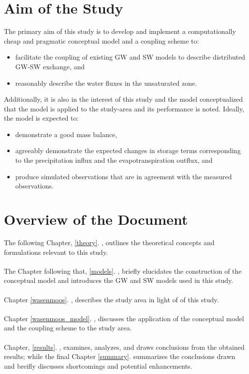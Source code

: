 \section{Aim of the Study}  \label{aim}
The primary aim of this study is to develop and implement a computationally cheap and pragmatic conceptual model and a coupling scheme to:
\begin{itemize}
    \item facilitate the coupling of existing GW and SW models to describe distributed GW-SW exchange, and
    \item reasonably describe the water fluxes in the unsaturated zone.
\end{itemize}
Additionally, it is also in the interest of this study and the model conceptualized that the model is applied to the study-area and its performance is noted. Ideally, the model is expected to:
\begin{itemize}
    \item demonstrate a good mass balance,
    \item agreeably demonstrate the expected changes in storage terms corresponding to the precipitation influx and the evapotranspiration outflux, and
    \item produce simulated observations that are in agreement with the measured observations.
\end{itemize}


\section{Overview of the Document}
The following Chapter, \ref{theory}. , outlines the theoretical concepts and formulations relevant to this study.
\\ \\
The Chapter following that, \ref{models}. , briefly elucidates the construction of the conceptual model and introduces the GW and SW models used in this study.
\\ \\
Chapter \ref{wasenmoos}. , describes the study area in light of of this study.
\\ \\
Chapter \ref{wasenmoos_model}. , discusses the application of the conceptual model and the coupling scheme to the study area.
\\ \\
Chapter, \ref{results}. , examines, analyzes, and draws conclusions from the obtained results; while the final Chapter \ref{summary}.  summarizes the conclusions drawn and breifly discusses shortcomings and potential enhancements.


\endinput